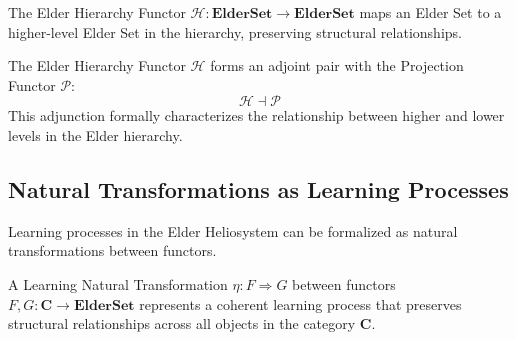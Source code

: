 \begin{definition}
The Elder Hierarchy Functor $\mathcal{H}: \mathbf{ElderSet} \to \mathbf{ElderSet}$ maps an Elder Set to a higher-level Elder Set in the hierarchy, preserving structural relationships.
\end{definition}

\begin{theorem}
The Elder Hierarchy Functor $\mathcal{H}$ forms an adjoint pair with the Projection Functor $\mathcal{P}$:
\begin{equation}
\mathcal{H} \dashv \mathcal{P}
\end{equation}
This adjunction formally characterizes the relationship between higher and lower levels in the Elder hierarchy.
\end{theorem}

\subsection{Natural Transformations as Learning Processes}

Learning processes in the Elder Heliosystem can be formalized as natural transformations between functors.

\begin{definition}
A Learning Natural Transformation $\eta: F \Rightarrow G$ between functors $F, G: \mathbf{C} \to \mathbf{ElderSet}$ represents a coherent learning process that preserves structural relationships across all objects in the category $\mathbf{C}$.
\end{definition}

